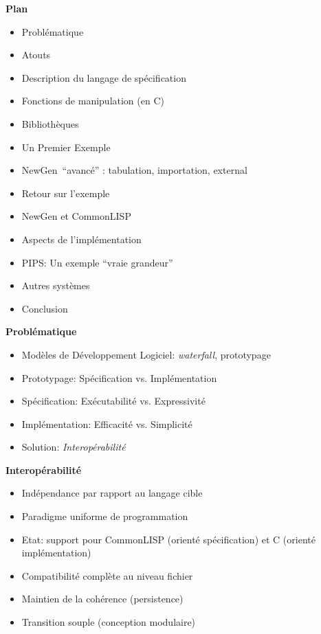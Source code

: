 \documentclass[11pt]{article}
\newcommand{\newgen}{NewGen}
\begin{document}
{\newpage 

\begin{center}
{\huge\bf Plan}
\end{center}

\vskip 2cm

\begin{itemize}
\item Problématique
\item Atouts
\item Description du langage de spécification
\item Fonctions de manipulation (en C)
\item Bibliothèques
\item Un Premier Exemple
\item \newgen~``avancé'' :  tabulation, importation, external
\item Retour sur l'exemple
\item NewGen et CommonLISP
\item Aspects de l'implémentation
\item PIPS: Un exemple ``vraie grandeur''
\item Autres systèmes
\item Conclusion
\end{itemize}

\newpage

\begin{center}
{\huge\bf Problématique}
\end{center}

\vskip 2cm

\begin{itemize}
\item Modèles de Développement Logiciel: {\em waterfall}, prototypage
\item Prototypage: Spécification vs. Implémentation
\item Spécification: Exécutabilité vs. Expressivité
\item Implémentation: Efficacité vs. Simplicité
\item Solution: {\em Interopérabilité}
\end{itemize}

\newpage

\begin{center}
{\huge\bf Interopérabilité}
\end{center}

\vskip 2cm

\begin{itemize}
\item Indépendance par rapport au langage cible
\item Paradigme uniforme de programmation
\item Etat: support pour CommonLISP (orienté spécification) et C
(orienté implémentation)
\item Compatibilité complète au niveau fichier
\item Maintien de la cohérence (persistence)
\item Transition souple (conception modulaire)
\end{itemize}

}
\end{document}
